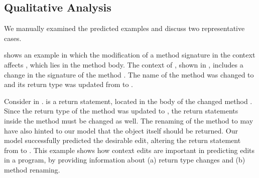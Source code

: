 \subsection{Qualitative Analysis}
We manually examined the predicted examples and discuss two representative cases.

 shows an example in which the modification of a method signature in the context affects , which lies in the method body.
The context of , shown in , includes a change in the signature of the method . 
The name of the method was changed to  and its return type was updated from  to .

Consider  in .  is a return statement, located in the body of the changed method . Since the return type of the method was updated to , the return statements inside the method must be changed as well.  The renaming of the method to  may have also hinted to our model that the  object itself should be returned.
Our model successfully predicted the desirable edit, altering the return statement from  to . 
This example shows how context edits are important in predicting edits in a program, 
by providing information about (a) return type changes and (b) method renaming.

